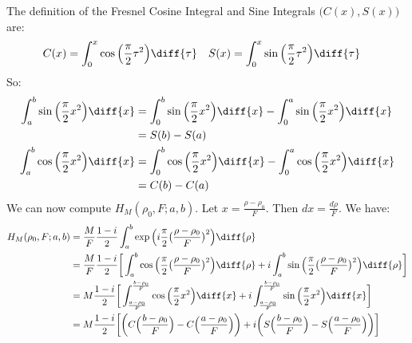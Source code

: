 \documentclass[crop=false,class=book,oneside]{standalone}
\begin{document}
            The definition of the Fresnel Cosine Integral and
            Sine Integrals $\big(C(x),S(x)\big)$ are:
            \begin{align*}
                C(x)
                &=\int_{0}^{x}\cos
                    \Big(\frac{\pi}{2}\tau^{2}\Big)\diff{\tau}
                &
                S(x)
                &=\int_{0}^{x}\sin
                    \Big(\frac{\pi}{2}\tau^{2}\Big)\diff{\tau}
            \end{align*}
            So:
            \begin{align*}
            \int_{a}^{b}\sin\Big(\frac{\pi}{2}x^{2}\Big)\diff{x}
            &=\int_{0}^{b}\sin\Big(\frac{\pi}{2}x^{2}\Big)\diff{x}-
            \int_{0}^{a}\sin\Big(\frac{\pi}{2}x^{2}\Big)\diff{x}\\
            &=S(b)-S(a)\\
            \int_{a}^{b}\cos\Big(\frac{\pi}{2}x^{2}\Big)\diff{x}
            &=\int_{0}^{b}\cos\Big(\frac{\pi}{2}x^{2}\Big)\diff{x}-\int_{0}^{a}\cos\Big(\frac{\pi}{2}x^{2}\Big)\diff{x}\\
            &=C(b)-C(a)
            \end{align*}
            We can now compute
            $H_{M}(\rho_0,F;a,b)$.
            Let $x=\frac{\rho-\rho_0}{F}$. Then $dx = \frac{d\rho}{F}$.
            We have:
            \begin{align*}
                H_{M}(\rho_0,F;a,b)
                &=\frac{M}{F}\frac{1-i}{2}
                    \int_{a}^{b}
                    \exp\Big(i\frac{\pi}{2}
                    \big(\frac{\rho-\rho_0}{F}\big)^{2}\Big)
                \diff{\rho}\\
                &=\frac{M}{F}\frac{1-i}{2}
                    \bigg[\int_{a}^{b}
                    \cos\Big(\frac{\pi}{2}
                    \big(\frac{\rho-\rho_0}{F}\big)^{2}\Big)
                \diff{\rho}+
                i\int_{a}^{b}
                    \sin\Big(\frac{\pi}{2}
                    \big(\frac{\rho-\rho_0}{F}\big)^{2}\Big)
                    \diff{\rho}\bigg]\\
                &=M\frac{1-i}{2}\bigg[
                    \int_{\frac{a-\rho_0}{F}}^{\frac{b-\rho_0}{F}}
                    \cos\Big(\frac{\pi}{2}x^{2}\Big)\diff{x}+
                i\int_{\frac{a-\rho_0}{F}}^{\frac{b-\rho_0}{F}}
                    \sin\Big(\frac{\pi}{2}x^{2}\Big)\diff{x}
                \bigg]\\
                &=M\frac{1-i}{2}
                    \bigg[\bigg(C\Big(\frac{b-\rho_{0}}{F}\Big)-
                        C\Big(\frac{a-\rho_0}{F}\Big)\bigg)
                    +i\bigg(S\Big(\frac{b-\rho_0}{F}\Big)-
                        S\Big(\frac{a-\rho_0}{F}\Big)\bigg)\bigg]
            \end{align*}
\end{document}
